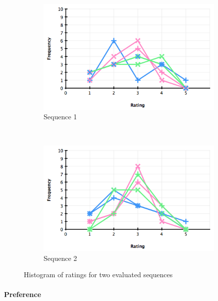 \begin{figure}
  \centering
  \begin{subfigure}[b]{.5\textwidth}
    \centering
      \includegraphics[width=\textwidth]{img/evaluation/hist_seq1}
    \caption{Sequence 1}
    \label{fig:evalSeq1}
  \end{subfigure}%
  ~
  \begin{subfigure}[b]{.5\textwidth}
    \centering
      \includegraphics[width=\textwidth]{img/evaluation/hist_seq2}
    \caption{Sequence 2}
    \label{fig:evalSeq2}
  \end{subfigure}
  \caption{Histogram of ratings for two evaluated sequences}
  \label{fig:evalSeqs}
\end{figure}

\paragraph{Preference}

